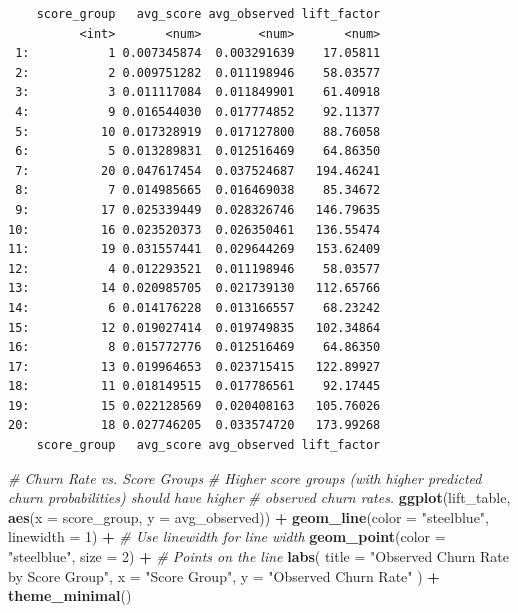 \documentclass[
]{article}
\newenvironment{Shaded}{\begin{snugshade}}{\end{snugshade}}
\newcommand{\AttributeTok}[1]{\textcolor[rgb]{0.13,0.29,0.53}{#1}}
\newcommand{\CommentTok}[1]{\textcolor[rgb]{0.56,0.35,0.01}{\textit{#1}}}
\newcommand{\DecValTok}[1]{\textcolor[rgb]{0.00,0.00,0.81}{#1}}
\newcommand{\FunctionTok}[1]{\textcolor[rgb]{0.13,0.29,0.53}{\textbf{#1}}}
\newcommand{\NormalTok}[1]{#1}
\newcommand{\SpecialCharTok}[1]{\textcolor[rgb]{0.81,0.36,0.00}{\textbf{#1}}}
\newcommand{\StringTok}[1]{\textcolor[rgb]{0.31,0.60,0.02}{#1}}
\begin{document}
\begin{verbatim}
    score_group   avg_score avg_observed lift_factor
          <int>       <num>        <num>       <num>
 1:           1 0.007345874  0.003291639    17.05811
 2:           2 0.009751282  0.011198946    58.03577
 3:           3 0.011117084  0.011849901    61.40918
 4:           9 0.016544030  0.017774852    92.11377
 5:          10 0.017328919  0.017127800    88.76058
 6:           5 0.013289831  0.012516469    64.86350
 7:          20 0.047617454  0.037524687   194.46241
 8:           7 0.014985665  0.016469038    85.34672
 9:          17 0.025339449  0.028326746   146.79635
10:          16 0.023520373  0.026350461   136.55474
11:          19 0.031557441  0.029644269   153.62409
12:           4 0.012293521  0.011198946    58.03577
13:          14 0.020985705  0.021739130   112.65766
14:           6 0.014176228  0.013166557    68.23242
15:          12 0.019027414  0.019749835   102.34864
16:           8 0.015772776  0.012516469    64.86350
17:          13 0.019964653  0.023715415   122.89927
18:          11 0.018149515  0.017786561    92.17445
19:          15 0.022128569  0.020408163   105.76026
20:          18 0.027746205  0.033574720   173.99268
    score_group   avg_score avg_observed lift_factor
\end{verbatim}

\begin{Shaded}
\begin{Highlighting}[]
\CommentTok{\#  Churn Rate vs. Score Groups}
\CommentTok{\# Higher score groups (with higher predicted churn probabilities) should have higher}
\CommentTok{\# observed churn rates.}
\FunctionTok{ggplot}\NormalTok{(lift\_table, }\FunctionTok{aes}\NormalTok{(}\AttributeTok{x =}\NormalTok{ score\_group, }\AttributeTok{y =}\NormalTok{ avg\_observed)) }\SpecialCharTok{+}
  \FunctionTok{geom\_line}\NormalTok{(}\AttributeTok{color =} \StringTok{"steelblue"}\NormalTok{, }\AttributeTok{linewidth =} \DecValTok{1}\NormalTok{) }\SpecialCharTok{+}  \CommentTok{\# Use \textasciigrave{}linewidth\textasciigrave{} for line width}
  \FunctionTok{geom\_point}\NormalTok{(}\AttributeTok{color =} \StringTok{"steelblue"}\NormalTok{, }\AttributeTok{size =} \DecValTok{2}\NormalTok{) }\SpecialCharTok{+}  \CommentTok{\# Points on the line}
  \FunctionTok{labs}\NormalTok{(}
    \AttributeTok{title =} \StringTok{"Observed Churn Rate by Score Group"}\NormalTok{,}
    \AttributeTok{x =} \StringTok{"Score Group"}\NormalTok{,}
    \AttributeTok{y =} \StringTok{"Observed Churn Rate"}
\NormalTok{  ) }\SpecialCharTok{+}
  \FunctionTok{theme\_minimal}\NormalTok{()}
\end{Highlighting}
\end{Shaded}
\end{document}
